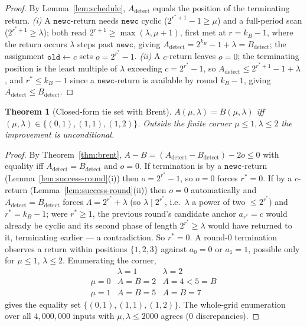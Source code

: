 \documentclass[11pt]{article}
\newtheorem{theorem}{Theorem}[section]
\newcommand{\oldc}{\texttt{old}}
\newcommand{\newc}{\texttt{newc}}
\begin{document}
\begin{proof}
By Lemma~\ref{lem:schedule}, $A_{\mathrm{detect}}$ equals the position of the
terminating return. \emph{(i)} A $\newc$-return needs $\newc$ cyclic
($2^{r^{\ast}+1}-1\ge\mu$) and a full-period scan ($2^{r^{\ast}+1}\ge\lambda$);
both read $2^{r+1}\ge\max(\lambda,\mu+1)$, first met at $r=k_B-1$, where the
return occurs $\lambda$ steps past $\newc$, giving
$A_{\mathrm{detect}}=2^{k_B}-1+\lambda=B_{\mathrm{detect}}$; the assignment
$\oldc\gets c$ sets $o=2^{r^{\ast}}-1$. \emph{(ii)} A $c$-return leaves $o=0$;
the terminating position is the least multiple of $\lambda$ exceeding
$c=2^{r^{\ast}}-1$, so $A_{\mathrm{detect}}\le 2^{r^{\ast}+1}-1+\lambda$, and
$r^{\ast}\le k_B-1$ since a $\newc$-return is available by round $k_B-1$, giving
$A_{\mathrm{detect}}\le B_{\mathrm{detect}}$.
\end{proof}

\begin{theorem}[Closed-form tie set with Brent]
\label{thm:brent-ties-closed}
$A(\mu,\lambda)=B(\mu,\lambda)$ \emph{iff}
$(\mu,\lambda)\in\{(0,1),(1,1),(1,2)\}$. Outside the finite corner
$\mu\le1,\lambda\le2$ the improvement is unconditional.
\end{theorem}

\begin{proof}
By Theorem~\ref{thm:brent},
$A-B=(A_{\mathrm{detect}}-B_{\mathrm{detect}})-2o\le0$ with equality iff
$A_{\mathrm{detect}}=B_{\mathrm{detect}}$ and $o=0$. If termination is by a
$\newc$-return (Lemma~\ref{lem:success-round}(i)) then $o=2^{r^{\ast}}-1$, so
$o=0$ forces $r^{\ast}=0$. If by a $c$-return
(Lemma~\ref{lem:success-round}(ii)) then $o=0$ automatically and
$A_{\mathrm{detect}}=B_{\mathrm{detect}}$ forces $\Lambda=2^{r^{\ast}}+\lambda$
(so $\lambda\mid 2^{r^{\ast}}$, i.e.\ $\lambda$ a power of two $\le 2^{r^{\ast}}$)
and $r^{\ast}=k_B-1$; were $r^{\ast}\ge1$, the previous round's candidate anchor
$a_{r^{\ast}}=c$ would already be cyclic and its second phase of length
$2^{r^{\ast}}\ge\lambda$ would have returned to it, terminating earlier --- a
contradiction. So $r^{\ast}=0$. A round-$0$ termination observes a return within
positions $\{1,2,3\}$ against $a_0=0$ or $a_1=1$, possible only for $\mu\le1$,
$\lambda\le2$. Enumerating the corner,
\[
\begin{array}{c|cc}
 & \lambda=1 & \lambda=2\\\hline
\mu=0 & A{=}B{=}2 & A{=}4<5{=}B\\
\mu=1 & A{=}B{=}5 & A{=}B{=}7
\end{array}
\]
gives the equality set $\{(0,1),(1,1),(1,2)\}$. The whole-grid enumeration over
all $4{,}000{,}000$ inputs with $\mu,\lambda\le2000$ agrees (0 discrepancies).
\end{proof}
\end{document}
